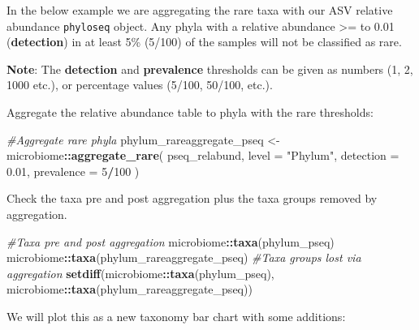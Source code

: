 \documentclass[
]{book}
\newenvironment{Shaded}{\begin{snugshade}}{\end{snugshade}}
\newcommand{\AttributeTok}[1]{\textcolor[rgb]{0.13,0.29,0.53}{#1}}
\newcommand{\CommentTok}[1]{\textcolor[rgb]{0.56,0.35,0.01}{\textit{#1}}}
\newcommand{\DecValTok}[1]{\textcolor[rgb]{0.00,0.00,0.81}{#1}}
\newcommand{\FloatTok}[1]{\textcolor[rgb]{0.00,0.00,0.81}{#1}}
\newcommand{\FunctionTok}[1]{\textcolor[rgb]{0.13,0.29,0.53}{\textbf{#1}}}
\newcommand{\NormalTok}[1]{#1}
\newcommand{\OtherTok}[1]{\textcolor[rgb]{0.56,0.35,0.01}{#1}}
\newcommand{\SpecialCharTok}[1]{\textcolor[rgb]{0.81,0.36,0.00}{\textbf{#1}}}
\newcommand{\StringTok}[1]{\textcolor[rgb]{0.31,0.60,0.02}{#1}}
\begin{document}
In the below example we are aggregating the rare taxa with our ASV relative abundance \texttt{phyloseq} object.
Any phyla with a relative abundance \textgreater= to 0.01 (\textbf{detection}) in at least 5\% (5/100) of the samples will not be classified as rare.

\textbf{Note}: The \textbf{detection} and \textbf{prevalence} thresholds can be given as numbers (1, 2, 1000 etc.), or percentage values (5/100, 50/100, etc.).

Aggregate the relative abundance table to phyla with the rare thresholds:

\begin{Shaded}
\begin{Highlighting}[]
\CommentTok{\#Aggregate rare phyla}
\NormalTok{phylum\_rareaggregate\_pseq }\OtherTok{\textless{}{-}}\NormalTok{ microbiome}\SpecialCharTok{::}\FunctionTok{aggregate\_rare}\NormalTok{(}
\NormalTok{  pseq\_relabund, }\AttributeTok{level =} \StringTok{"Phylum"}\NormalTok{,}
  \AttributeTok{detection =} \FloatTok{0.01}\NormalTok{, }\AttributeTok{prevalence =} \DecValTok{5}\SpecialCharTok{/}\DecValTok{100}
\NormalTok{)}
\end{Highlighting}
\end{Shaded}

Check the taxa pre and post aggregation plus the taxa groups removed by aggregation.

\begin{Shaded}
\begin{Highlighting}[]
\CommentTok{\#Taxa pre and post aggregation}
\NormalTok{microbiome}\SpecialCharTok{::}\FunctionTok{taxa}\NormalTok{(phylum\_pseq)}
\NormalTok{microbiome}\SpecialCharTok{::}\FunctionTok{taxa}\NormalTok{(phylum\_rareaggregate\_pseq)}
\CommentTok{\#Taxa groups lost via aggregation}
\FunctionTok{setdiff}\NormalTok{(microbiome}\SpecialCharTok{::}\FunctionTok{taxa}\NormalTok{(phylum\_pseq), microbiome}\SpecialCharTok{::}\FunctionTok{taxa}\NormalTok{(phylum\_rareaggregate\_pseq))}
\end{Highlighting}
\end{Shaded}

We will plot this as a new taxonomy bar chart with some additions:
\end{document}
